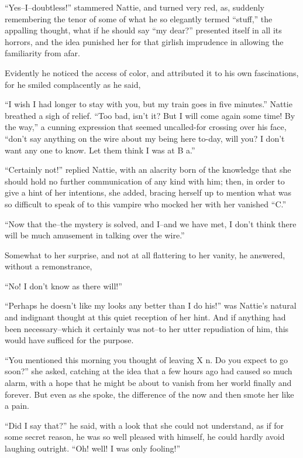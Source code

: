 ``Yes--I--doubtless!'' stammered Nattie, and turned very red, as, suddenly
remembering the tenor of some of what he so elegantly termed ``stuff,''
the appalling thought, what if he should say ``my dear?'' presented itself
in all its horrors, and the idea punished her for that girlish
imprudence in allowing the familiarity from afar.

Evidently he noticed the access of color, and attributed it to his own
fascinations, for he smiled complacently as he said,

``I wish I had longer to stay with you, but my train goes in five
minutes.'' Nattie breathed a sigh of relief. ``Too bad, isn't it? But I
will come again some time! By the way,'' a cunning expression that seemed
uncalled-for crossing over his face, ``don't say anything on the wire
about my being here to-day, will you? I don't want any one to know. Let
them think I was at B a.''

``Certainly not!'' replied Nattie, with an alacrity born of the knowledge
that she should hold no further communication of any kind with him;
then, in order to give a hint of her intentions, she added, bracing
herself up to mention what was so difficult to speak of to this vampire
who mocked her with her vanished ``C.''

``Now that the--the mystery is solved, and I--and we have met, I don't
think there will be much amusement in talking over the wire.''

Somewhat to her surprise, and not at all flattering to her vanity, he
answered, without a remonstrance,

``No! I don't know as there will!''

``Perhaps he doesn't like my looks any better than I do his!'' was
Nattie's natural and indignant thought at this quiet reception of her
hint. And if anything had been necessary--which it certainly was not--to
her utter repudiation of him, this would have sufficed for the purpose.

``You mentioned this morning you thought of leaving X n. Do you expect to
go soon?'' she asked, catching at the idea that a few hours ago had
caused so much alarm, with a hope that he might be about to vanish from
her world finally and forever. But even as she spoke, the difference of
the now and then smote her like a pain.

``Did I say that?'' he said, with a look that she could not understand, as
if for some secret reason, he was so well pleased with himself, he could
hardly avoid laughing outright. ``Oh! well! I was only fooling!''

